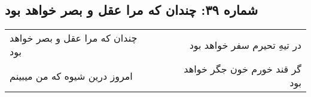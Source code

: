 \begin{center}
\section*{شماره ۳۹: چندان که مرا عقل و بصر خواهد بود}
\label{sec:039}
\begin{longtable}{l p{0.5cm} r}
چندان که مرا عقل و بصر خواهد بود
&&
در تیهِ تحیرم سفر خواهد بود
\\
امروز درین شیوه که من میبینم
&&
گر قند خورم خون جگر خواهد بود
\\
\end{longtable}
\end{center}
